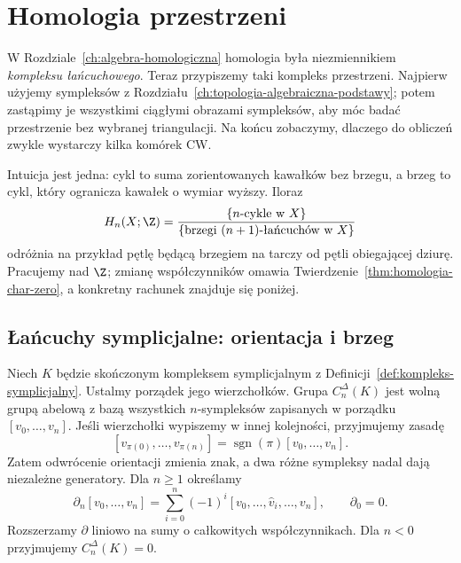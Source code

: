 \chapter{Homologia przestrzeni}
\label{ch:homologia-przestrzeni}

W Rozdziale~\ref{ch:algebra-homologiczna} homologia była
niezmiennikiem \emph{kompleksu łańcuchowego}.
Teraz przypiszemy taki kompleks przestrzeni. Najpierw
użyjemy sympleksów z Rozdziału~\ref{ch:topologia-algebraiczna-podstawy};
potem zastąpimy je wszystkimi ciągłymi obrazami sympleksów,
aby móc badać przestrzenie bez wybranej triangulacji. Na końcu
zobaczymy, dlaczego do obliczeń zwykle wystarczy
kilka komórek CW.

Intuicja jest jedna: cykl to suma zorientowanych kawałków
bez brzegu, a brzeg to cykl, który ogranicza kawałek
o wymiar wyższy. Iloraz
\[
 H_n(X;\Z)=
 \frac{\{\text{$n$-cykle w $X$}\}}
 {\{\text{brzegi $(n+1)$-łańcuchów w $X$}\}}
\]
odróżnia na przykład pętlę będącą brzegiem na tarczy od pętli
obiegającej dziurę. Pracujemy nad $\Z$; zmianę
współczynników omawia
Twierdzenie~\ref{thm:homologia-char-zero},
a konkretny rachunek znajduje się poniżej.

\section{Łańcuchy symplicjalne: orientacja i brzeg}
\label{sec:homologia-symplicjalna}

\begin{definicja}
\label{def:homologia-symplicjalna}
Niech $K$ będzie skończonym kompleksem symplicjalnym
z Definicji~\ref{def:kompleks-symplicjalny}.
Ustalmy porządek jego wierzchołków. Grupa
$C_n^\Delta(K)$ jest wolną grupą abelową z bazą
wszystkich $n$-sympleksów zapisanych w porządku
$[v_0,\ldots,v_n]$. Jeśli wierzchołki wypiszemy
w innej kolejności, przyjmujemy zasadę
\[
 [v_{\pi(0)},\ldots,v_{\pi(n)}]
 =\operatorname{sgn}(\pi)[v_0,\ldots,v_n].
\]
Zatem odwrócenie orientacji zmienia znak, a dwa
różne sympleksy nadal dają niezależne generatory.
Dla $n\geq1$ określamy
\begin{equation}\label{eq:brzeg-symplicjalny}
 \partial_n[v_0,\ldots,v_n]
 =\sum_{i=0}^n(-1)^i
 [v_0,\ldots,\widehat v_i,\ldots,v_n],
 \qquad \partial_0=0.
\end{equation}
Rozszerzamy $\partial$ liniowo na sumy
o całkowitych współczynnikach. Dla $n<0$ przyjmujemy $C_n^\Delta(K)=0$.
\end{definicja}


